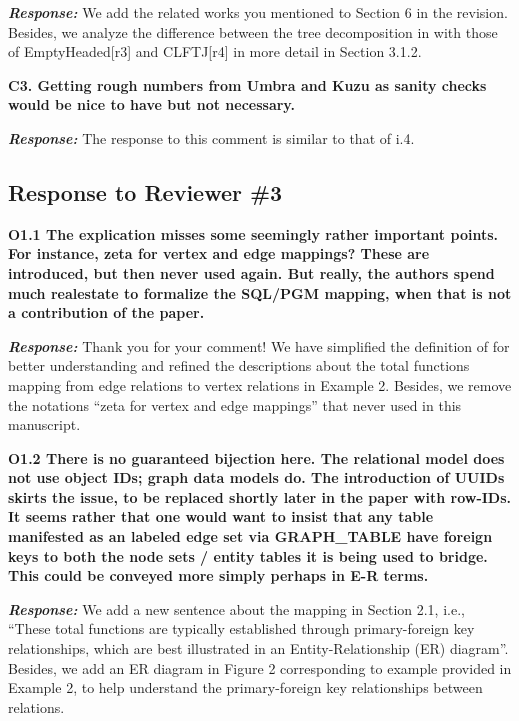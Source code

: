 \textbf{\textit{Response: }} We add the related works you mentioned to Section 6 in the revision. Besides, we analyze the difference between the tree decomposition in \name with those of EmptyHeaded[r3] and CLFTJ[r4] in more detail in Section 3.1.2.


\textbf{
C3. Getting rough numbers from Umbra and Kuzu as sanity checks would be nice to have but not necessary.}

\textbf{\textit{Response: }}
The response to this comment is similar to that of i.4.


\subsection{Response to Reviewer \#3}

\textbf{
O1.1 The explication misses some seemingly rather important points.
For instance, zeta for vertex and edge mappings? These are introduced, but then never used again. But really, the authors spend much realestate to formalize the SQL/PGM mapping, when that is not a contribution of the paper.}

\textbf{\textit{Response: }}
Thank you for your comment! We have simplified the definition of \rgmapping for better understanding and refined the descriptions about the total functions mapping from edge relations to vertex relations in Example 2.
Besides, we remove the notations ``zeta for vertex and edge mappings'' that never used in this manuscript.


\textbf{
O1.2 There is no guaranteed bijection here. The relational model does not use object IDs; graph data models do. The introduction of UUIDs skirts the issue, to be replaced shortly later in the paper with row-IDs. It seems rather that one would want to insist that any table manifested as an labeled edge set via GRAPH\_TABLE have foreign keys to both the node sets / entity tables it is being used to bridge. This could be conveyed more simply perhaps in E-R terms.}

\textbf{\textit{Response: }}
We add a new sentence about the mapping in Section 2.1, i.e., ``These total functions are typically established through primary-foreign key relationships, which are best illustrated in an Entity-Relationship (ER) diagram''.
Besides, we add an ER diagram in Figure 2 corresponding to example provided in Example 2, to help understand the primary-foreign key relationships between relations. 


